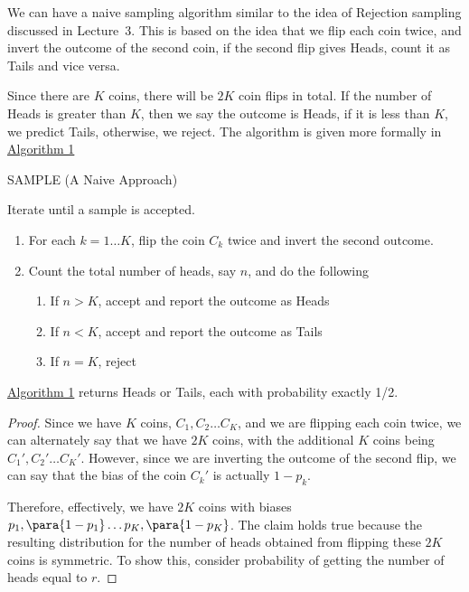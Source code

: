 \documentclass[a4paper,10pt]{article}
\begin{document}
\begin{question}

	We can have a naive sampling algorithm similar to the idea of Rejection sampling discussed in \mbox{Lecture 3}.
	This is based on the idea that we flip each coin twice, and invert the outcome of the second coin, \ie if the second flip gives Heads, count it as Tails and vice versa.

	Since there are $K$ coins, there will be $2K$ coin flips in total.
	If the number of Heads is greater than $K$, then we say the outcome is Heads, if it is less than $K$, we predict Tails, otherwise, we reject.
	The algorithm is given more formally in \hyperlink{algo:1.1}{Algorithm 1}

	\begin{algo}[0.9\textwidth]{SAMPLE (A Naive Approach)}

		Iterate until a sample is accepted.
		\begin{enumerate}
			\item For each $k = 1 \dots K$, flip the coin $C_k$ twice and invert the second outcome.
			\item Count the total number of heads, say $n$, and do the following
				\begin{enumerate}
					\item If $n > K$, accept and report the outcome as Heads
					\item If $n < K$, accept and report the outcome as Tails
					\item If $n = K$, reject
				\end{enumerate}
		\end{enumerate}

	\end{algo}

	\begin{claim}
		\hyperlink{algo:1.2}{Algorithm 1} returns Heads or Tails, each with probability exactly 1/2.

		\begin{proof}
			Since we have $K$ coins, \ie $C_1, C_2 \dots C_K$, and we are flipping each coin twice, we can alternately say that we have $2K$ coins, with the additional $K$ coins being $C_1', C_2' \dots C_K'$.
			However, since we are inverting the outcome of the second flip, we can say that the bias of the coin $C_k'$ is actually $1 - p_k$.

			Therefore, effectively, we have $2K$ coins with biases $p_1, \para{1 - p_1} \dots p_K, \para{1 - p_K}$.
			The claim holds true because the resulting distribution for the number of heads obtained from flipping these $2K$ coins is symmetric.
			To show this, consider probability of getting the number of heads equal to $r$.


\end{proof}
\end{claim}
\end{question}
\end{document}
